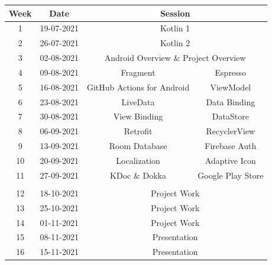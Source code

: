 \documentclass{article}
\begin{document}
\renewcommand{\arraystretch}{1.5}
\begin{tabular}{|c|c|c|c|}
	\hline
	\textbf{Week} & \textbf{Date}     & \multicolumn{2}{c|}{\textbf{Session}}        \\ \hline
	\small 1      & \small 19-07-2021 & \multicolumn{2}{c|}{\small Kotlin 1} \\ \hline
	\small 2      & \small 26-07-2021 & \multicolumn{2}{c|}{\small Kotlin 2} \\ \hline
	\small 3      & \small 02-08-2021 & \multicolumn{2}{c|}{\small Android Overview \& Project Overview} \\ \hline
	\small 4      & \small 09-08-2021 & \small Fragment & \small Espresso   \\ \hline
	\small 5      & \small 16-08-2021 & \small GitHub Actions for Android & \small ViewModel \\ \hline
	\small 6      & \small 23-08-2021 & \small LiveData & \small Data Binding  \\ \hline
	\small 7      & \small 30-08-2021 & \small View Binding & \small DataStore  \\ \hline
	\small 8      & \small 06-09-2021 & \small Retrofit & \small RecyclerView  \\ \hline
	\small 9      & \small 13-09-2021 & \small Room Database  & \small Firebase Auth  \\ \hline

	\small 10     & \small 20-09-2021 & \small Localization & \small Adaptive Icon   \\ \hline 
	\small 11     & \small 27-09-2021 & \small KDoc \& Dokka & \small Google Play Store  \\ \hline
	\rowcolor{yellow} \multicolumn{4}{|c|}{\small Mid Term Break}                    \\ \hline
	\small 12     & \small 18-10-2021 & \multicolumn{2}{c|}{\small Project Work}     \\ \hline
	\small 13     & \small 25-10-2021 & \multicolumn{2}{c|}{\small Project Work}     \\ \hline
	\small 14     & \small 01-11-2021 & \multicolumn{2}{c|}{\small Project Work}     \\ \hline
	\small 15     & \small 08-11-2021 & \multicolumn{2}{c|}{\small Presentation}     \\ \hline
	\small 16     & \small 15-11-2021 & \multicolumn{2}{c|}{\small Presentation}     \\ \hline
\end{tabular}
\end{document}
